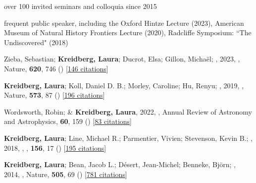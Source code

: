\documentclass[12pt,letterpaper]{article}
\begin{document}
\begin{list}{}{\cvlist}
\item over 100 invited seminars and colloquia since 2015 
\item frequent public speaker, including the
    Oxford Hintze Lecture (2023), American Museum of Natural History Frontiers Lecture (2020), Radcliffe Symposium: ``The Undiscovered" (2018)
\end{list}






\begin{list}{}{\cvlist}
\item[{\color{numcolor}\scriptsize1}] Zieba, Sebastian; \textbf{Kreidberg, Laura}; Ducrot, Elsa; Gillon, Micha{\"e}l; \etal, 2023, , Nature, \textbf{620}, 746 () [\href{https://ui.adsabs.harvard.edu/abs/2023Natur.620..746Z}{146 citations}]

\item[{\color{numcolor}\scriptsize2}] \textbf{Kreidberg, Laura}; Koll, Daniel D. B.; Morley, Caroline; Hu, Renyu; \etal, 2019, , Nature, \textbf{573}, 87 () [\href{https://ui.adsabs.harvard.edu/abs/2019Natur.573...87K}{196 citations}]

\item[{\color{numcolor}\scriptsize3}] Wordsworth, Robin; \& \textbf{Kreidberg, Laura}, 2022, , Annual Review of Astronomy and Astrophysics, \textbf{60}, 159 () [\href{https://ui.adsabs.harvard.edu/abs/2022ARA&A..60..159W}{83 citations}]

\item[{\color{numcolor}\scriptsize4}] \textbf{Kreidberg, Laura}; Line, Michael R.; Parmentier, Vivien; Stevenson, Kevin B.; \etal, 2018, , \aj, \textbf{156}, 17 () [\href{https://ui.adsabs.harvard.edu/abs/2018AJ....156...17K}{195 citations}]


\item[{\color{numcolor}\scriptsize5}] \textbf{Kreidberg, Laura}; Bean, Jacob L.; D{\'e}sert, Jean-Michel; Benneke, Bj{\"o}rn; \etal, 2014, , Nature, \textbf{505}, 69 () [\href{https://ui.adsabs.harvard.edu/abs/2014Natur.505...69K}{781 citations}]

\end{list}
\end{document}
